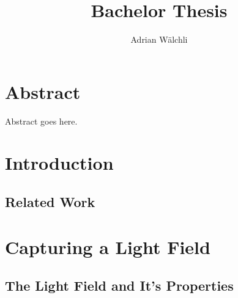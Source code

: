 \documentclass[10pt,a4paper,onecolumn]{book}
\author{Adrian Wälchli}
\title{Bachelor Thesis}
\begin{document}


\chapter*{Abstract}
	Abstract goes here.


\tableofcontents

\chapter{Introduction}
\section{Related Work}

\chapter{Capturing a Light Field}
\section{The Light Field and It's Properties}





\end{document}
